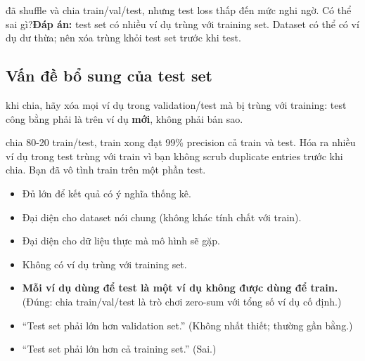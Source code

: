 \documentclass[12pt,a4paper]{article}
\begin{document}
\begin{luuy}[title={Bài tập: test loss thấp bất thường, có thể sai gì?}] đã shuffle và chia train/val/test, nhưng test loss thấp đến mức nghi ngờ. Có thể sai gì?\n\n\textbf{Đáp án:} test set có nhiều ví dụ trùng với training set. Dataset có thể có ví dụ dư thừa; nên xóa trùng khỏi test set trước khi test.\n\end{luuy}

\subsection{Vấn đề bổ sung của test set}

\begin{luuy}\nSau khi chia, hãy xóa mọi ví dụ trong validation/test mà bị trùng với training: test công bằng phải là trên ví dụ \textbf{mới}, không phải bản sao.\n\end{luuy}

\begin{vidu}[title={Ví dụ spam email}] chia 80-20 train/test, train xong đạt 99\% precision cả train và test. Hóa ra nhiều ví dụ trong test trùng với train vì bạn không scrub duplicate entries trước khi chia. Bạn đã vô tình train trên một phần test.\n\end{vidu}

\begin{tinhchat}[title={Một test/validation set tốt}]\n\begin{itemize}\n  \item Đủ lớn để kết quả có ý nghĩa thống kê.\n  \item Đại diện cho dataset nói chung (không khác tính chất với train).\n  \item Đại diện cho dữ liệu thực mà mô hình sẽ gặp.\n  \item Không có ví dụ trùng với training set.\n\end{itemize}\n\end{tinhchat}

\begin{luuy}[title={Bài tập: phát biểu đúng}]\n\begin{itemize}\n  \item \textbf{Mỗi ví dụ dùng để test là một ví dụ không được dùng để train.} (Đúng: chia train/val/test là trò chơi zero-sum với tổng số ví dụ cố định.)\n  \item ``Test set phải lớn hơn validation set.'' (Không nhất thiết; thường gần bằng.)\n  \item ``Test set phải lớn hơn cả training set.'' (Sai.)\n\end{itemize}\n\end{luuy}
\end{document}
